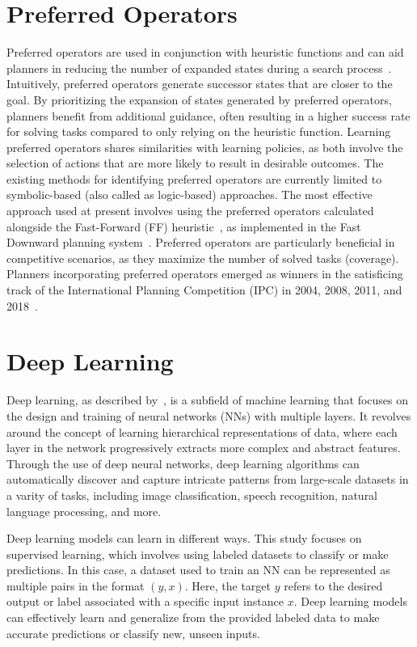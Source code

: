 \documentclass[ppgc,diss,english]{iiufrgs}
\begin{document}
\section{Preferred Operators}
\label{sec:intro-preferred-ops}
Preferred operators are used in conjunction with heuristic functions and can aid planners in reducing the number of expanded states during a search process~\cite{Helmert/2006,Richter.Helmert/2009}. Intuitively, preferred operators generate successor states that are closer to the goal. By prioritizing the expansion of states generated by preferred operators, planners benefit from additional guidance, often resulting in a higher success rate for solving tasks compared to only relying on the heuristic function. Learning preferred operators shares similarities with learning policies, as both involve the selection of actions that are more likely to result in desirable outcomes. The existing methods for identifying preferred operators are currently limited to symbolic-based (also called as logic-based) approaches. The most effective approach used at present involves using the preferred operators calculated alongside the Fast-Forward (FF) heuristic~\cite{Hoffmann.Nebel/2001}, as implemented in the Fast Downward planning system~\cite{Helmert/2006}. Preferred operators are particularly beneficial in competitive scenarios, as they maximize the number of solved tasks (coverage). Planners incorporating preferred operators emerged as winners in the satisficing track of the International Planning Competition (IPC) in 2004, 2008, 2011, and 2018~\cite{Helmert/2006,Richter.lama.etal/2011,Richter.lama.etal/2011,Seipp-fast.etal/2018}.

\section{Deep Learning}
\label{sec:intro-deep-learning}
Deep learning, as described by~\citet{Goodfellow.etal/2016}, is a subfield of machine learning that focuses on the design and training of neural networks (NNs) with multiple layers. It revolves around the concept of learning hierarchical representations of data, where each layer in the network progressively extracts more complex and abstract features. Through the use of deep neural networks, deep learning algorithms can automatically discover and capture intricate patterns from large-scale datasets in a varity of tasks, including image classification, speech recognition, natural language processing, and more.

Deep learning models can learn in different ways. This study focuses on supervised learning, which involves using labeled datasets to classify or make predictions. In this case, a dataset used to train an NN can be represented as multiple pairs in the format $(y, x)$. Here, the target $y$ refers to the desired output or label associated with a specific input instance $x$. Deep learning models can effectively learn and generalize from the provided labeled data to make accurate predictions or classify new, unseen inputs.
\end{document}
